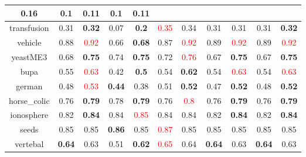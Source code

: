\documentclass{article}%
\begin{document}
\begin{tabular}{c|cccccccccc}
{0.16
}&0.1&\textbf{0.11}&0.1&\textbf{0.11}\\%
\hline%
transfusion&0.31&\textbf{0.32}&0.07&\textbf{0.2}&\textcolor{red}{ 
0.35
}&0.34&0.31&0.31&0.31&\textbf{0.32}\\%
\hline%
vehicle&0.88&\textcolor{red}{ 
0.92
}&0.66&\textbf{0.68}&0.87&\textcolor{red}{ 
0.92
}&0.89&\textcolor{red}{ 
0.92
}&0.89&\textcolor{red}{ 
0.92
}\\%
\hline%
yeastME3&0.68&\textbf{0.75}&0.74&\textbf{0.75}&0.72&\textcolor{red}{ 
0.76
}&0.67&\textbf{0.75}&0.67&\textbf{0.75}\\%
\hline%
bupa&0.55&\textcolor{red}{ 
0.63
}&0.42&\textbf{0.5}&0.54&\textbf{0.62}&0.54&\textcolor{red}{ 
0.63
}&0.54&\textcolor{red}{ 
0.63
}\\%
\hline%
german&0.48&\textcolor{red}{ 
0.53
}&\textbf{0.44}&0.38&0.51&\textbf{0.52}&0.47&\textbf{0.52}&0.48&\textbf{0.52}\\%
\hline%
horse\_colic&0.76&\textbf{0.79}&0.78&\textbf{0.79}&0.76&\textcolor{red}{ 
0.8
}&0.76&\textbf{0.79}&0.76&\textbf{0.79}\\%
\hline%
ionosphere&0.82&\textbf{0.84}&0.84&\textcolor{red}{ 
0.85
}&0.84&0.84&0.82&\textbf{0.84}&0.82&\textbf{0.84}\\%
\hline%
seeds&0.85&0.85&\textbf{0.86}&0.85&\textcolor{red}{ 
0.87
}&0.85&0.85&0.85&0.85&0.85\\%
\hline%
vertebal&\textbf{0.64}&0.63&0.51&\textbf{0.62}&\textcolor{red}{ 
0.65
}&0.64&\textbf{0.64}&0.63&\textbf{0.64}&0.63\\%
\hline%
\end{tabular}

%
\end{document}

